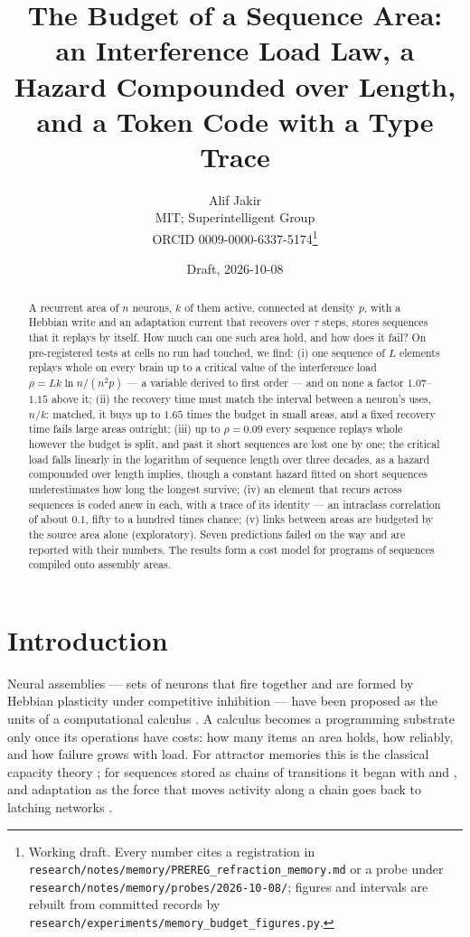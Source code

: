 \documentclass[11pt]{article}
\title{The Budget of a Sequence Area:\\
an Interference Load Law, a Hazard Compounded over Length,\\
and a Token Code with a Type Trace}
\author{Alif Jakir\\ \small MIT; Superintelligent Group\\ \small ORCID 0009-0000-6337-5174\thanks{Working draft. Every number
cites a registration in \texttt{research/notes/memory/PREREG\_refraction\_memory.md}
or a probe under \texttt{research/notes/memory/probes/2026-10-08/}; figures and
intervals are rebuilt from committed records by
\texttt{research/experiments/memory\_budget\_figures.py}.}}
\date{Draft, 2026-10-08}
\theoremstyle{definition}
\theoremstyle{plain}
\begin{document}
\maketitle

\begin{abstract}
A recurrent area of $n$ neurons, $k$ of them active, connected at density $p$,
with a Hebbian write and an adaptation current that recovers over $\tau$ steps,
stores sequences that it replays by itself. How much can one such area hold,
and how does it fail? On pre-registered tests at cells no run had touched, we
find: (i) one sequence of $L$ elements replays whole on every brain up to a
critical value of the interference load $\rho = Lk\ln n/(n^2p)$ --- a variable
derived to first order --- and on none a factor $1.07$--$1.15$ above it; (ii) the
recovery time must match the interval between a neuron's uses, $n/k$: matched,
it buys up to $1.65$ times the budget in small areas, and a fixed recovery time
fails large areas outright; (iii) up to $\rho = 0.09$ every sequence replays
whole however the budget is split, and past it short sequences are lost one by
one; the critical load falls linearly in the logarithm of sequence length over
three decades, as a hazard compounded over length implies, though a constant
hazard fitted on short sequences underestimates how long the longest survive;
(iv) an element that recurs across sequences is coded anew in
each, with a trace of its identity --- an intraclass correlation of about
$0.1$, fifty to a hundred times chance; (v) links between areas are budgeted by
the source area alone (exploratory). Seven predictions failed on the way and are
reported with their numbers. The results form a cost model for programs of
sequences compiled onto assembly areas.
\end{abstract}

\section{Introduction}

Neural assemblies --- sets of neurons that fire together and are formed by
Hebbian plasticity under competitive inhibition --- have been proposed as the
units of a computational calculus
\citep{papadimitriou2020brain,dabagia2025sequences}. A calculus becomes a
programming substrate only once its operations have costs: how many items an
area holds, how reliably, and how failure grows with load. For attractor
memories this is the classical capacity theory
\citep{willshaw1969nonholographic,amit1985storing,tsodyks1988enhanced}; for
sequences stored as chains of transitions it began with
\citet{sompolinsky1986temporal} and \citet{kleinfeld1986sequential}, and
adaptation as the force that moves activity along a chain goes back to latching
networks \citep{treves2005frontal}.
\end{document}
